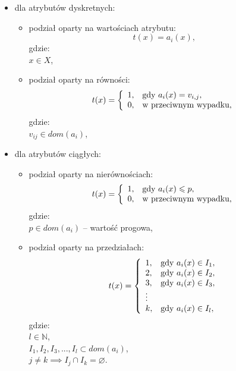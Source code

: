 \documentclass[12pt]{article}
\begin{document}
\begin{itemize}

    \item dla atrybutów dyskretnych:
    \begin{itemize}
        \item podział oparty na wartościach atrybutu:
            $$t(x) = a_i(x),$$
            gdzie:\\
            $x \in X$,

        \item podział oparty na równości:
            $$  t(x) = \left\{
                \begin{array}{ll}
                1, & \textnormal{gdy } a_i(x) = v_{i,j}, \\
                0, & \textnormal{w przeciwnym wypadku,}
                \end{array} \right.
            $$
            gdzie:\\
            $v_{ij} \in dom(a_i)$,
    \end{itemize}

    \item dla atrybutów ciągłych:
    \begin{itemize}
        \item podział oparty na nierównościach:
            $$  t(x) = \left\{
                \begin{array}{ll}
                1, & \textnormal{gdy } a_i(x) \leqslant p, \\
                0, & \textnormal{w przeciwnym wypadku,}
                \end{array} \right.
            $$
            gdzie:\\
            $p \in dom(a_i)$ -- wartość progowa,

        \item podział oparty na przedziałach:
            $$  t(x) = \left\{
                \begin{array}{ll}
                1, & \textnormal{gdy } a_i(x) \in I_1, \\
                2, & \textnormal{gdy } a_i(x) \in I_2, \\
                3, & \textnormal{gdy } a_i(x) \in I_3, \\
                \vdots & \\
                k, & \textnormal{gdy } a_i(x) \in I_l, \\
                
                \end{array} \right.
            $$
            gdzie:\\
            $l \in \mathbb{N}$,\\
            $I_1, I_2, I_3, ..., I_l \subset dom(a_i)$, \\
            $j \neq k \implies I_j \cap I_k = \varnothing$.
    \end{itemize}

\end{itemize}
\end{document}
